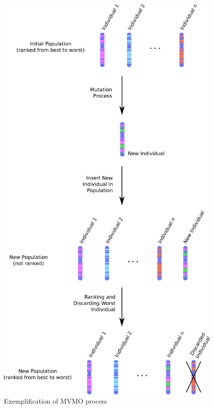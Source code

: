 \begin{figure}[h]
	\caption{Exemplification of MVMO process}
	\begin{center}
		\includegraphics[scale=.2]{Images/MVMO_process.eps}
	\end{center}
	\label{fig: MVMOprocess}
\end{figure}

